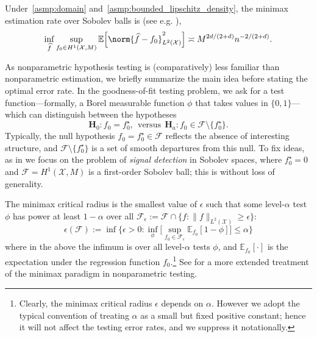 \documentclass[twoside]{article}
\newcommand{\1}{\mathbf{1}}
\newcommand{\Xset}{\mathcal{X}}
\newcommand{\Leb}{L}
\newcommand{\mc}[1]{\mathcal{#1}}
\newcommand{\Ebb}{\mathbb{E}}
\newcommand{\wh}[1]{\widehat{#1}}
\theoremstyle{definition}
\theoremstyle{remark}
\begin{document}
Under~\ref{asmp:domain} and~\ref{asmp:bounded_lipschitz_density}, the minimax estimation rate over Sobolev balls is (see e.g. \citep{tsybakov2008_book}),
\begin{equation}
\label{eqn:sobolev_space_estimation_minimax_rate}
\inf_{\wh{f}} \sup_{f_0 \in H^1(\Xset, M)} \Ebb\Bigl[\norm{\wh{f} - f_0}_{L^2(\Xset)}^2\Bigr] \asymp M^{2d/(2 + d)}n^{-2/(2 + d)}.
\end{equation}

As nonparametric hypothesis testing is (comparatively) less familiar than nonparametric estimation, we briefly summarize the main idea before stating the optimal error rate. In the goodness-of-fit testing problem, we ask for a test function---formally, a Borel measurable function $\phi$ that takes values in $\{0,1\}$--- which can distinguish between the hypotheses
\begin{equation}
\mathbf{H}_0: f_0 = f_0^{\star}, ~~\textrm{versus}~~ \mathbf{H}_a: f_0 \in \mc{F} \setminus \{f_0^{\star}\}.
\end{equation} 
Typically, the null hypothesis $f_0 = f_0^{\star} \in \mc{F}$ reflects the absence of interesting structure, and $\mc{F} \setminus  \{f_0^{\star}\}$ is a set of smooth departures from this null. To fix ideas, as in \cite{ingster2009} we focus on the problem of \emph{signal detection} in Sobolev spaces, where $f_0^{\star} = 0$ and $\mc{F} = H^1(\Xset,M)$ is a first-order Sobolev ball; this is without loss of generality.

The minimax critical radius is the smallest value of $\epsilon$ such that some level-${\alpha}$ test $\phi$ has power at least $1 - \alpha$ over all $\mc{F}_{\epsilon} := \mc{F} \cap \{f: \|f\|_{\Leb^2(\Xset)} \geq \epsilon\}$:
\begin{equation*}
\epsilon(\mc{F}) := \inf\Biggl\{\epsilon > 0: \inf_{\phi} \biggl[ \sup_{f_0 \in \mc{F}_{\epsilon}} \Ebb_{f_0}[1 - \phi]\biggr] \leq \alpha\Biggr\}
\end{equation*} 
where in the above the infimum is over all level-$\alpha$ tests $\phi$, and $\Ebb_{f_0}[\cdot]$ is the expectation under the regression function $f_0$.\footnote{ Clearly, the minimax critical radius $\epsilon$ depends on $\alpha$. However we adopt the typical convention of treating $\alpha$ as a small but fixed positive constant; hence it will not affect the testing error rates, and we suppress it notationally.} See \citep{ingster82, ingster87, ingster2012} for a more extended treatment of the minimax paradigm in nonparametric testing. 
\end{document}
